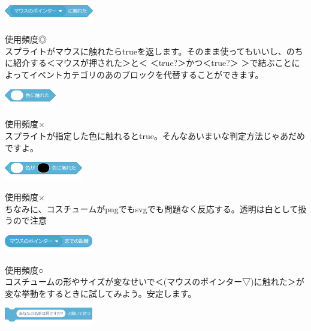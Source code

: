 \documentclass[b5paper,10pt]{jsarticle}
\begin{document}
\begin{multicols*}{3}
\begin{itembox}{1}
\includegraphics[width=39mm]{images/sensing_1.png}
\end{itembox}
使用頻度◎\\
スプライトがマウスに触れたらtrueを返します。そのまま使ってもいいし、のちに紹介する＜マウスが押された＞と＜ ＜true?＞かつ＜true?＞ ＞で結ぶことによってイベントカテゴリのあのブロックを代替することができます。
\begin{itembox}{2}
\includegraphics[height=8mm]{images/sensing_2.png}
\end{itembox}
使用頻度×\\
スプライトが指定した色に触れるとtrue。そんなあいまいな判定方法じゃあだめですよ。
\begin{itembox}{3}
\includegraphics[height=8mm]{images/sensing_3.png}
\end{itembox}
使用頻度×\\
ちなみに、コスチュームがpngでもsvgでも問題なく反応する。透明は白として扱うので注意
\begin{itembox}{4}
\includegraphics[height=8mm]{images/sensing_4.png}
\end{itembox}
使用頻度○\\
コスチュームの形やサイズが変なせいで＜(マウスのポインター▽)に触れた＞が変な挙動をするときに試してみよう。安定します。
\begin{itembox}{5}
\includegraphics[height=8mm]{images/sensing_5.png}


\end{itembox}
\end{multicols*}
\end{document}
